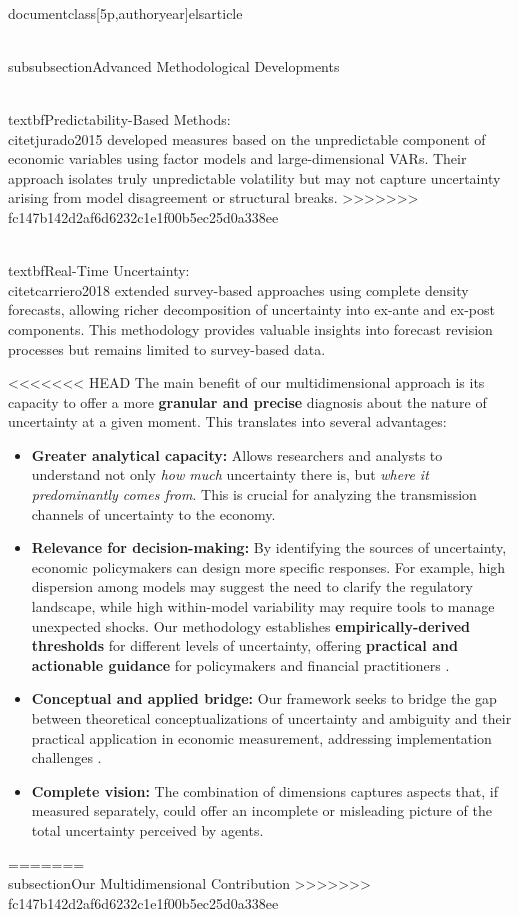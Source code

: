 \\documentclass[5p,authoryear]{elsarticle}
\begin{document}
{\\subsubsection{Advanced Methodological Developments}

\\textbf{Predictability-Based Methods:} \\citet{jurado2015} developed measures based on the unpredictable component of economic variables using factor models and large-dimensional VARs. Their approach isolates truly unpredictable volatility but may not capture uncertainty arising from model disagreement or structural breaks.
>>>>>>> fc147b142d2af6d6232c1e1f00b5ec25d0a338ee

\\textbf{Real-Time Uncertainty:} \\citet{carriero2018} extended survey-based approaches using complete density forecasts, allowing richer decomposition of uncertainty into ex-ante and ex-post components. This methodology provides valuable insights into forecast revision processes but remains limited to survey-based data.

<<<<<<< HEAD
The main benefit of our multidimensional approach is its capacity to offer a more \textbf{granular and precise} diagnosis about the nature of uncertainty at a given moment. This translates into several advantages:
\begin{itemize}
    \item \textbf{Greater analytical capacity:} Allows researchers and analysts to understand not only \emph{how much} uncertainty there is, but \emph{where it predominantly comes from}. This is crucial for analyzing the transmission channels of uncertainty to the economy.
    \item \textbf{Relevance for decision-making:} By identifying the sources of uncertainty, economic policymakers can design more specific responses. For example, high dispersion among models may suggest the need to clarify the regulatory landscape, while high within-model variability may require tools to manage unexpected shocks. Our methodology establishes \textbf{empirically-derived thresholds} for different levels of uncertainty, offering \textbf{practical and actionable guidance} for policymakers and financial practitioners \cite{risk_analysis}.
    \item \textbf{Conceptual and applied bridge:} Our framework seeks to bridge the gap between theoretical conceptualizations of uncertainty and ambiguity and their practical application in economic measurement, addressing implementation challenges \cite{risk_analysis}.
    \item \textbf{Complete vision:} The combination of dimensions captures aspects that, if measured separately, could offer an incomplete or misleading picture of the total uncertainty perceived by agents.
\end{itemize}
=======
\\subsection{Our Multidimensional Contribution}
>>>>>>> fc147b142d2af6d6232c1e1f00b5ec25d0a338ee

}
\end{document}
